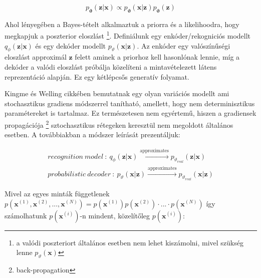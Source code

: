 \documentclass[12pt, english]{article}
\begin{document}
\vspace{4mm}

\begin{equation}
    p_{\boldsymbol{\vartheta}}(\boldsymbol{\bm{z}} | \boldsymbol{\bm{x}}) \propto p_{\boldsymbol{\vartheta}}(\boldsymbol{\bm{x}} | \boldsymbol{\bm{z}}) p_{\boldsymbol{\vartheta}}(\boldsymbol{\bm{z}})
\end{equation}

\vspace{4mm}

\par Ahol lényegében a Bayes-tételt alkalmaztuk a priorra és a likelihoodra, hogy megkapjuk a poszterior eloszlást \footnote{a valódi poszteriort általános esetben nem lehet kiszámolni, mivel szükség lenne $p_{\vartheta}(\bm{x})$}. Definiálunk egy enkóder/rekogniciós modellt $q_{\phi}(\boldsymbol{\bm{z}} | \boldsymbol{\bm{x}})$ és egy dekóder modellt $p_{\vartheta}(\boldsymbol{\bm{x}} | \boldsymbol{\bm{z}})$. Az enkóder egy valószínűségi eloszlást approximál $\boldsymbol{\bm{z}}$ felett aminek a priorhoz kell hasonlónak lennie, míg a dekóder a valódi eloszlást próbálja közelíteni a mintavételezett látens reprezentáció alapján. Ez egy kétlépcsős generatív folyamat. 

\vspace{4mm}

\par Kingme és Welling cikkében \cite{kingma2013auto} bemutatnak egy olyan variációs modellt ami stochasztikus gradiens módszerrel tanítható, amellett, hogy nem determinisztikus paramétereket is tartalmaz. Ez természetesen nem egyértemű, hiszen a gradiensek propagációja \footnote{back-propagation} sztochasztikus rétegeken keresztül nem megoldott általános esetben. A továbbiakban a módszer leírását prezentáljuk:

\vspace{4mm}

\begin{gather*}
    recognition\ model\ :\  q_{\phi}(\bm{z}|\bm{x}) \xrightarrow{\text{approximates}} p_{\vartheta_{real}}(\bm{z} | \bm{x}) \\
    probabilistic\ decoder\ :\ p_{\vartheta}(\bm{x} | \bm{z}) \xrightarrow{\text{approximates}} p_{\vartheta_{real}}(\bm{x} | \bm{z})
\end{gather*}

\vspace{4mm}

\par Mivel az egyes minták függetlenek $p(\bm{x}^{(1)}, \bm{x}^{(2)}, ..., \bm{x}^{(N)}) = p(\bm{x}^{(1)})p(\bm{x}^{(2)})\cdot ... \cdot p(\bm{x}^{(N)})$ így számolhatunk $p(\bm{x}^{(i)})$-n mindent, közelítőleg $p(\bm{x}^{(i)})$:
\end{document}
